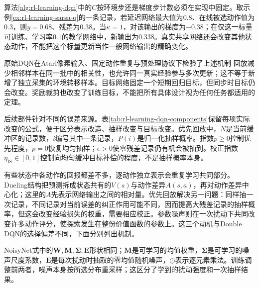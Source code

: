 算法\ref{alg:rl-learning-dqn}中的$C$按环境步还是梯度步计数必须在实现中固定。取示例\ref{ex:rl-learning-sarsa-q}的一条记录，若延迟网络最大值为$0.8$、在线被选动作值为$0.3$，则$y=0.68$、残差为$0.38$。当$\kappa=1$，对该输出的梯度为$-0.38$；在仅这一标量可训练、学习率$0.1$的教学网络中，新输出为$0.338$。真实共享网络还会改变其他状态动作，不能把这个标量更新当作一般网络输出的精确变化。

原始DQN在Atari像素输入、固定动作重复与预处理协议下检验了上述机制
回放减少相邻样本在同一批中的相关性，也允许同一真实经验参与多次更新；这不等于新增了独立采集的环境转移样本。目标网络固定一个短期回归目标，但同步时目标仍会改变。奖励裁剪也改变了训练目标，不能把所有具体设计视为任何任务都适用的定理。

后续部件针对不同的误差来源。表\ref{tab:rl-learning-dqn-components}保留每项实际改变的公式，便于区分表示改造、抽样改变与目标改变。优先回放中，$N$是当前缓冲区的记录数，$i$编号其中一条记录，$P(i)$是归一化抽样概率。指数$p\geq0$控制优先程度，$p=0$恢复均匀抽样；$\epsilon>0$使零残差记录仍有机会被抽到。校正指数$\eta_{\mathrm{IS}}\in[0,1]$控制向均匀缓冲目标补偿的程度，不是抽样概率本身。

有些状态中各动作的回报都差不多，逐动作独立表示会重复学习共同部分。Dueling结构把预测拆成状态共有的$V(s)$与动作差异$A(s,a)$，再对动作差异中心化；这里的$A$先表示网络输出之间的相对量。优先回放解决另一问题：同样抽一次记录，不同记录对当前误差的纠正作用可能不同，因而提高大残差记录的抽样概率，但这会改变经验损失的权重，需要相应校正。参数噪声则在一次扰动下共同改变许多动作评分，使探索发生在整份价值函数的参数上。这三个动机与Double DQN的选择偏差不同，下面分别列出机制。

NoisyNet式中的$\bm W,\bm M,\bm\Sigma,\bm E$形状相同；$\bm M$是可学习的均值权重，$\bm\Sigma$是可学习的噪声尺度系数，$\bm E$是每次扰动时抽取的零均值随机噪声，$\odot$表示逐元素乘法。训练调整前两者，噪声本身按所选分布重采样；这区分了学到的扰动强度和一次抽样结果。

